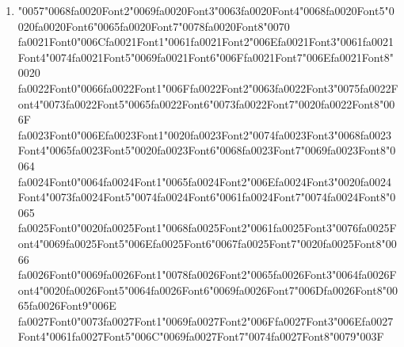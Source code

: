 \documentclass[12pt]{article}
\begin{document}
\begin{enumerate}[label=Q\arabic*.]
 \item {\char"0057}{\char"0068}{\csname fa0020Font2\endcsname\char"0069}{\csname fa0020Font3\endcsname\char"0063}{\csname fa0020Font4\endcsname\char"0068}{\csname fa0020Font5\endcsname\char"0020}{\csname fa0020Font6\endcsname\char"0065}{\csname fa0020Font7\endcsname\char"0078}{\csname fa0020Font8\endcsname\char"0070} {\csname fa0021Font0\endcsname\char"006C}{\csname fa0021Font1\endcsname\char"0061}{\csname fa0021Font2\endcsname\char"006E}{\csname fa0021Font3\endcsname\char"0061}{\csname fa0021Font4\endcsname\char"0074}{\csname fa0021Font5\endcsname\char"0069}{\csname fa0021Font6\endcsname\char"006F}{\csname fa0021Font7\endcsname\char"006E}{\csname fa0021Font8\endcsname\char"0020} {\csname fa0022Font0\endcsname\char"0066}{\csname fa0022Font1\endcsname\char"006F}{\csname fa0022Font2\endcsname\char"0063}{\csname fa0022Font3\endcsname\char"0075}{\csname fa0022Font4\endcsname\char"0073}{\csname fa0022Font5\endcsname\char"0065}{\csname fa0022Font6\endcsname\char"0073}{\csname fa0022Font7\endcsname\char"0020}{\csname fa0022Font8\endcsname\char"006F} {\csname fa0023Font0\endcsname\char"006E}{\csname fa0023Font1\endcsname\char"0020}{\csname fa0023Font2\endcsname\char"0074}{\csname fa0023Font3\endcsname\char"0068}{\csname fa0023Font4\endcsname\char"0065}{\csname fa0023Font5\endcsname\char"0020}{\csname fa0023Font6\endcsname\char"0068}{\csname fa0023Font7\endcsname\char"0069}{\csname fa0023Font8\endcsname\char"0064} {\csname fa0024Font0\endcsname\char"0064}{\csname fa0024Font1\endcsname\char"0065}{\csname fa0024Font2\endcsname\char"006E}{\csname fa0024Font3\endcsname\char"0020}{\csname fa0024Font4\endcsname\char"0073}{\csname fa0024Font5\endcsname\char"0074}{\csname fa0024Font6\endcsname\char"0061}{\csname fa0024Font7\endcsname\char"0074}{\csname fa0024Font8\endcsname\char"0065} {\csname fa0025Font0\endcsname\char"0020}{\csname fa0025Font1\endcsname\char"0068}{\csname fa0025Font2\endcsname\char"0061}{\csname fa0025Font3\endcsname\char"0076}{\csname fa0025Font4\endcsname\char"0069}{\csname fa0025Font5\endcsname\char"006E}{\csname fa0025Font6\endcsname\char"0067}{\csname fa0025Font7\endcsname\char"0020}{\csname fa0025Font8\endcsname\char"0066} {\csname fa0026Font0\endcsname\char"0069}{\csname fa0026Font1\endcsname\char"0078}{\csname fa0026Font2\endcsname\char"0065}{\csname fa0026Font3\endcsname\char"0064}{\csname fa0026Font4\endcsname\char"0020}{\csname fa0026Font5\endcsname\char"0064}{\csname fa0026Font6\endcsname\char"0069}{\csname fa0026Font7\endcsname\char"006D}{\csname fa0026Font8\endcsname\char"0065}{\csname fa0026Font9\endcsname\char"006E} {\csname fa0027Font0\endcsname\char"0073}{\csname fa0027Font1\endcsname\char"0069}{\csname fa0027Font2\endcsname\char"006F}{\csname fa0027Font3\endcsname\char"006E}{\csname fa0027Font4\endcsname\char"0061}{\csname fa0027Font5\endcsname\char"006C}{\char"0069}{\csname fa0027Font7\endcsname\char"0074}{\csname fa0027Font8\endcsname\char"0079}{\char"003F}

\end{enumerate}
\end{document}
